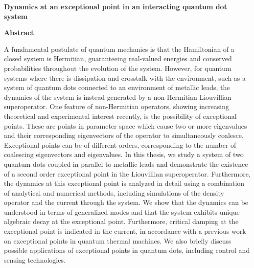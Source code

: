 \documentclass[../main.tex]{subfiles}
\begin{document}
\thispagestyle{plain}
\begin{center}
    \Large
    \textbf{Dynamics at an exceptional point in an interacting quantum dot system}
    
    \vspace{0.4cm}
    
    \vspace{0.4cm}
    
    \vspace{0.9cm}
    \textbf{Abstract}
\end{center}
A fundamental postulate of quantum mechanics is that the Hamiltonian of a closed system is Hermitian, guaranteeing real-valued energies and conserved probabilities throughout the evolution of the system. However, for quantum systems where there is dissipation and crosstalk with the environment, such as a system of quantum dots connected to an environment of metallic leads, the dynamics of the system is instead generated by a non-Hermitian Liouvillian superoperator. One feature of non-Hermitian operators, showing increasing theoretical and experimental interest recently, is the possibility of exceptional points. These are points in parameter space which cause two or more eigenvalues and their corresponding eigenvectors of the operator to simultaneously coalesce. Exceptional points can be of different orders, corresponding to the number of coalescing eigenvectors and eigenvalues. In this thesis, we study a system of two quantum dots coupled in parallel to metallic leads and demonstrate the existence of a second order exceptional point in the Liouvillian superoperator. Furthermore, the dynamics at this exceptional point is analyzed in detail using a combination of analytical and numerical methods, including simulations of the density operator and the current through the system. We show that the dynamics can be understood in terms of generalized modes and that the system exhibits unique algebraic decay at the exceptional point. Furthermore, critical damping at the exceptional point is indicated in the current, in accordance with a previous work on exceptional points in quantum thermal machines. We also briefly discuss possible applications of exceptional points in quantum dots, including control and sensing technologies. 
\end{document}
